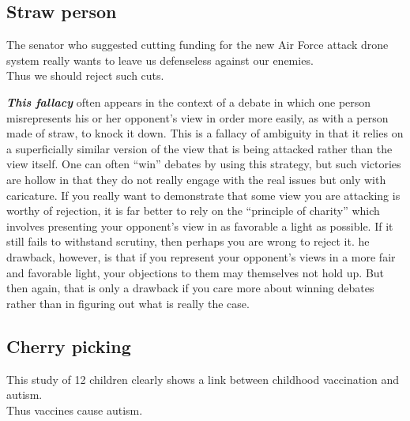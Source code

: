 \documentclass[12pt, openany]{book}
\begin{document}
\hypertarget{straw-person}{%
\subsection*{Straw person}\label{straw-person}}


\begin{center}

\begin{argument}

The senator who suggested cutting funding for the new Air Force attack drone system really wants to leave us defenseless against our enemies.\\

Thus we should reject such cuts.

\end{argument}

\end{center}

\textbf{\emph{This fallacy}} often appears in the context of a debate in which one person misrepresents his or her opponent's view in order more easily, as with a person made of straw, to knock it down. This is a fallacy of ambiguity in that it relies on a superficially similar version of the view that is being attacked rather than the view itself. One can often ``win'' debates by using this strategy, but such victories are hollow in that they do not really engage with the real issues but only with caricature. If you really want to demonstrate that some view you are attacking is worthy of rejection, it is far better to rely on the ``principle of charity'' which involves presenting your opponent's view in as favorable a light as possible. If it still fails to withstand scrutiny, then perhaps you are wrong to reject it. he drawback, however, is that if you represent your opponent's views in a more fair and favorable light, your objections to them may themselves not hold up. But then again, that is only a drawback if you care more about winning debates rather than in figuring out what is really the case.

\hypertarget{cherry-picking}{%
\subsection*{Cherry picking}\label{cherry-picking}}


\begin{center}

\begin{argument}

This study of 12 children clearly shows a link between childhood vaccination and autism.\\

Thus vaccines cause autism.

\end{argument}

\end{center}
\end{document}

